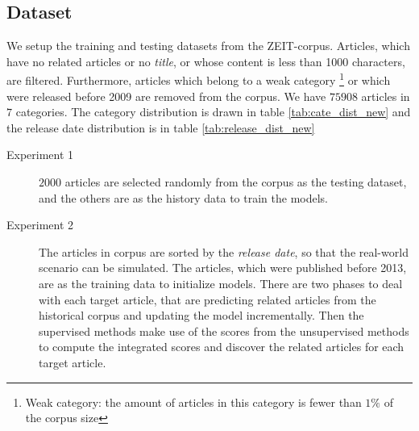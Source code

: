 \subsection{Dataset}

We setup the training and testing datasets from the ZEIT-corpus. Articles, which have no related articles or no \textit{title}, or whose content is less than 1000 characters, are filtered. Furthermore, articles which belong to a weak category \footnote{Weak category: the amount of articles in this category is fewer than $1\%$ of the corpus size} or which were released before 2009 are removed from the corpus. We have $75908$ articles in $7$ categories. The category distribution is drawn in table \ref{tab:cate_dist_new} and the release date distribution is in table \ref{tab:release_dist_new}




\begin{description}
\item[Experiment 1] $2000$ articles are selected randomly from the corpus as the testing dataset, and the others are as the history data to train the models. 
\item[Experiment 2] The articles in corpus are sorted by the \textit{release date}, so that the real-world scenario can be simulated. The articles, which were published before 2013, are as the training data to initialize models. There are two phases to deal with each target article, that are predicting related articles from the historical corpus and updating the model incrementally. Then the supervised methods make use of the scores from the unsupervised methods to compute the integrated scores and discover the related articles for each target article. 
\end{description}
